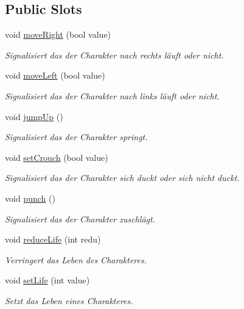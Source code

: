 \subsection*{Public Slots}
\begin{DoxyCompactItemize}
\item 
void \hyperlink{class_character_a732ddad97c8e4b271aac67ba1d7d3c98}{move\+Right} (bool value)
\begin{DoxyCompactList}\small\item\em Signalisiert das der Charakter nach rechts läuft oder nicht. \end{DoxyCompactList}\item 
void \hyperlink{class_character_adcc18bee13545c734c695dee06a9f094}{move\+Left} (bool value)
\begin{DoxyCompactList}\small\item\em Signalisiert das der Charakter nach links läuft oder nicht. \end{DoxyCompactList}\item 
void \hyperlink{class_character_a2257c559f50f1e78eea8d49dbe12af49}{jump\+Up} ()
\begin{DoxyCompactList}\small\item\em Signalisiert das der Charakter springt. \end{DoxyCompactList}\item 
void \hyperlink{class_character_a8cfbb3e6ea62013a74f7b837054ee03f}{set\+Crouch} (bool value)
\begin{DoxyCompactList}\small\item\em Signalisiert das der Charakter sich duckt oder sich nicht duckt. \end{DoxyCompactList}\item 
void \hyperlink{class_character_a5745dbf38bf7b408f254408f898a2e46}{punch} ()
\begin{DoxyCompactList}\small\item\em Signalisiert das der Charakter zuschlägt. \end{DoxyCompactList}\item 
void \hyperlink{class_character_aacbdc7590f8a9f6b295117a9675e2ab5}{reduce\+Life} (int redu)
\begin{DoxyCompactList}\small\item\em Verringert das Leben des Charakteres. \end{DoxyCompactList}\item 
void \hyperlink{class_character_a6a3f9b96fd22d73660f458e52a2e04ba}{set\+Life} (int value)
\begin{DoxyCompactList}\small\item\em Setzt das Leben eines Charakteres. \end{DoxyCompactList}\item 

\end{DoxyCompactItemize}
